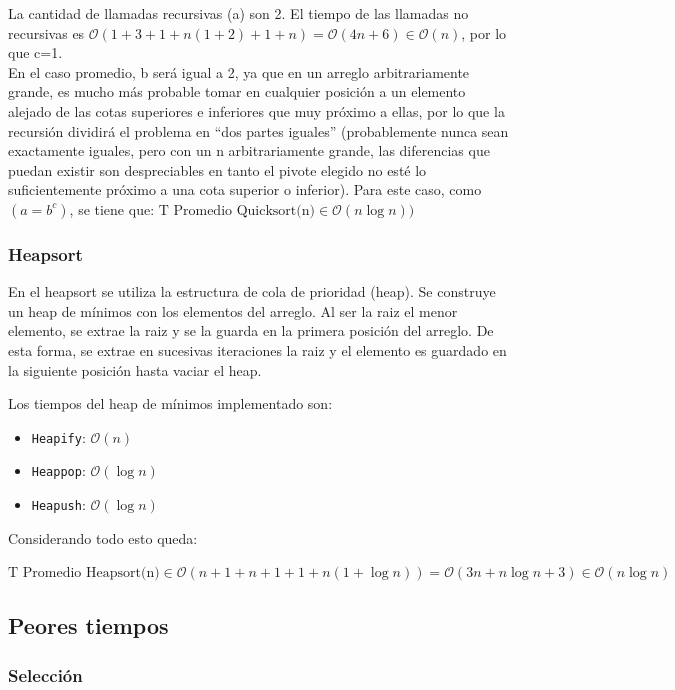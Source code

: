 \documentclass[article,a4paper]{article}
\begin{document}
La cantidad de llamadas recursivas (a) son 2. El tiempo de las llamadas no recursivas es $\mathcal O(1 + 3 + 1 + n (1 + 2) + 1 + n) = \mathcal O(4n + 6) \in \mathcal O(n)$, por lo que c=1.\\

En el caso promedio, b será igual a 2, ya que en un arreglo arbitrariamente grande, es mucho más probable tomar en cualquier posición a un elemento alejado de las cotas superiores e inferiores que muy próximo a ellas, por lo que la recursión dividirá el problema en “dos partes iguales” (probablemente nunca sean exactamente iguales, pero con un n arbitrariamente grande, las diferencias que puedan existir son despreciables en tanto el pivote elegido no esté lo suficientemente próximo a una cota superior o inferior). Para este caso, como $(a = b^c)$, se tiene que: $\mbox{T Promedio Quicksort(n)} \in \mathcal O(n \log n))$

\subsubsection{Heapsort}

En el heapsort se utiliza la estructura de cola de prioridad (heap). Se construye un heap de mínimos con los elementos del arreglo. Al ser la raiz el menor elemento, se extrae la raiz y se la guarda en la primera posición del arreglo. De esta forma, se extrae en sucesivas iteraciones la raiz y el elemento es guardado en la siguiente posición hasta vaciar el heap.

Los tiempos del heap de mínimos implementado son:

\begin{itemize}
\item \texttt{Heapify}: $\mathcal O(n)$
\item \texttt{Heappop}: $\mathcal O(\log n)$
\item \texttt{Heapush}: $\mathcal O(\log n)$
\end{itemize}

Considerando todo esto queda: 

$\mbox{T Promedio Heapsort(n)} \in \mathcal O(n + 1 + n + 1 + 1 + n (1 + \log n)) = \mathcal O(3n + n \log n + 3) \in \mathcal O(n \log n)$ 

\subsection{Peores tiempos}

\subsubsection{Selección}
\end{document}

